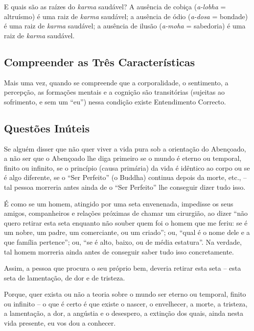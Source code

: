 E quais são as raízes do \emph{karma} saudável? A ausência de cobiça
(\emph{a-lobha} = altruísmo) é uma raiz de \emph{karma} saudável; a ausência de
ódio (\emph{a-dosa} = bondade) é uma raiz de \emph{karma} saudável; a ausência
de ilusão (\emph{a-moha} = sabedoria) é uma raiz de \emph{karma} saudável.


\subsection{Compreender as Três Características}


Mais uma vez, quando se compreende que a corporalidade, o sentimento, a
percepção, as formações mentais e a cognição são transitórias (sujeitas ao
sofrimento, e sem um “eu”) nessa condição existe Entendimento Correcto.


\subsection{Questões Inúteis}

Se alguém disser que não quer viver a vida pura sob a orientação do Abençoado, a
não ser que o Abençoado lhe diga primeiro se o mundo é eterno ou temporal,
finito ou infinito, se o princípio (causa primária) da vida é idêntico ao corpo
ou se é algo diferente, se o “Ser Perfeito” (o Buddha) continua depois da
morte, etc., -- tal pessoa morreria antes ainda de o “Ser Perfeito” lhe
conseguir dizer tudo isso.

É como se um homem, atingido por uma seta envenenada, impedisse os seus amigos,
companheiros e relações próximas de chamar um cirurgião, ao dizer “não quero
retirar esta seta enquanto não souber quem foi o homem que me feriu: se é um
nobre, um padre, um comerciante, ou um criado”; ou, “qual é o nome dele e a
que família pertence”; ou, “se é alto, baixo, ou de média estatura”. Na
verdade, tal homem morreria ainda antes de conseguir saber tudo isso
concretamente.


Assim, a pessoa que procura o seu próprio bem, deveria retirar esta seta -- esta
seta de lamentação, de dor e de tristeza.


Porque, quer exista ou não a teoria sobre o mundo ser eterno ou temporal, finito
ou infinito -- o que é certo é que existe o nascer, o envelhecer, a morte, a
tristeza, a lamentação, a dor, a angústia e o desespero, a extinção dos quais,
ainda nesta vida presente, eu vos dou a conhecer.


